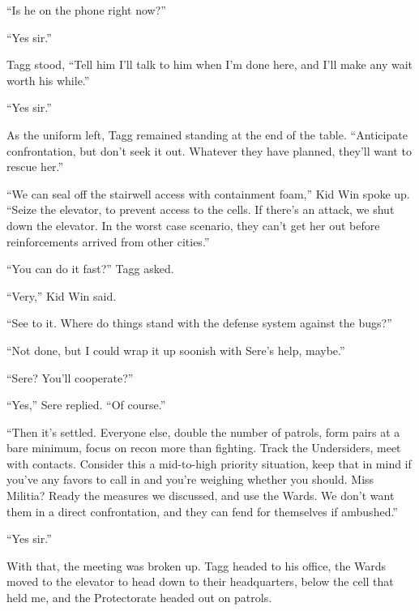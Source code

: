 ``Is he on the phone right now?''



``Yes sir.''



Tagg stood, ``Tell him I'll talk to him when I'm done here, and I'll make any wait worth his while.''



``Yes sir.''



As the uniform left, Tagg remained standing at the end of the table.  ``Anticipate confrontation, but don't seek it out.  Whatever they have planned, they'll want to rescue her.''



``We can seal off the stairwell access with containment foam,'' Kid Win spoke up.  ``Seize the elevator, to prevent access to the cells.  If there's an attack, we shut down the elevator.  In the worst case scenario, they can't get her out before reinforcements arrived from other cities.''



``You can do it fast?''  Tagg asked.



``Very,'' Kid Win said.



``See to it.  Where do things stand with the defense system against the bugs?''



``Not done, but I could wrap it up soonish with Sere's help, maybe.''



``Sere?  You'll cooperate?''



``Yes,'' Sere replied.  ``Of course.''



``Then it's settled.  Everyone else, double the number of patrols, form pairs at a bare minimum, focus on recon more than fighting.  Track the Undersiders, meet with contacts.  Consider this a mid-to-high priority situation, keep that in mind if you've any favors to call in and you're weighing whether you should.  Miss Militia?  Ready the measures we discussed, and use the Wards.  We don't want them in a direct confrontation, and they can fend for themselves if ambushed.''



``Yes sir.''



With that, the meeting was broken up.  Tagg headed to his office, the Wards moved to the elevator to head down to their headquarters, below the cell that held me, and the Protectorate headed out on patrols.



